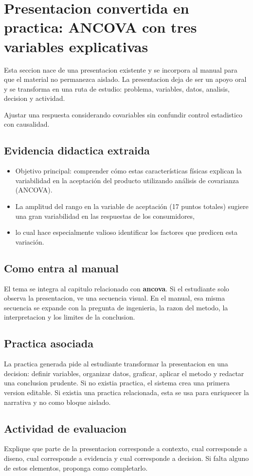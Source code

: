 \section{Presentacion convertida en practica: ANCOVA con tres variables explicativas}

Esta seccion nace de una presentacion existente y se incorpora al manual para que el material no permanezca aislado. La presentacion deja de ser un apoyo oral y se transforma en una ruta de estudio: problema, variables, datos, analisis, decision y actividad.

\begin{idea}
Ajustar una respuesta considerando covariables sin confundir control estadistico con causalidad.
\end{idea}

\subsection{Evidencia didactica extraida}

\begin{itemize}
\item Objetivo principal: comprender cómo estas características físicas explican la variabilidad en la aceptación del producto utilizando análisis de covarianza (ANCOVA).
\item La amplitud del rango en la variable de aceptación (17 puntos totales) sugiere una gran variabilidad en las respuestas de los consumidores,
\item lo cual hace especialmente valioso identificar los factores que predicen esta variación.
\end{itemize}

\subsection{Como entra al manual}

El tema se integra al capitulo relacionado con \textbf{ancova}. Si el estudiante solo observa la presentacion, ve una secuencia visual. En el manual, esa misma secuencia se expande con la pregunta de ingenieria, la razon del metodo, la interpretacion y los limites de la conclusion.

\subsection{Practica asociada}

La practica generada pide al estudiante transformar la presentacion en una decision: definir variables, organizar datos, graficar, aplicar el metodo y redactar una conclusion prudente. Si no existia practica, el sistema crea una primera version editable. Si existia una practica relacionada, esta se usa para enriquecer la narrativa y no como bloque aislado.

\subsection{Actividad de evaluacion}

Explique que parte de la presentacion corresponde a contexto, cual corresponde a diseno, cual corresponde a evidencia y cual corresponde a decision. Si falta alguno de estos elementos, proponga como completarlo.
